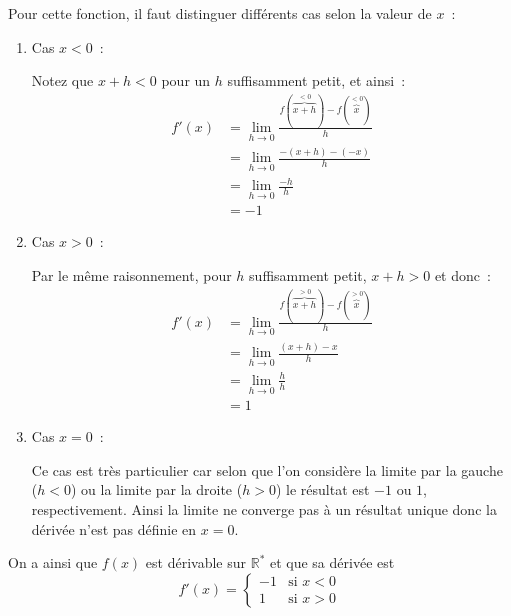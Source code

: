\begin{exercice}
\begin{enumerate}
    Pour cette fonction, il faut distinguer différents cas selon la valeur de $x$~:
    \begin{enumerate}
        \item Cas $x < 0$~:
        
        Notez que $x + h < 0$ pour un $h$ suffisamment petit, et ainsi~:
        \begin{align*}
            f'(x) &= \lim_{h \to 0} \frac{f(\overbrace{x + h}^{< 0}) - f(\overbrace{x}^{< 0})}{h} \\
            &= \lim_{h \to 0} \frac{-(x + h) - (-x)}{h} \\
            &= \lim_{h \to 0} \frac{-h}{h} \\
            &= -1
        \end{align*}
        
        \item Cas $x > 0$~:
        
        Par le même raisonnement, pour $h$ suffisamment petit, $x + h > 0$ et donc~:
        \begin{align*}
            f'(x) &= \lim_{h \to 0} \frac{f(\overbrace{x + h}^{> 0}) - f(\overbrace{x}^{> 0})}{h} \\
            &= \lim_{h \to 0} \frac{(x + h) - x}{h} \\
            &= \lim_{h \to 0} \frac{h}{h} \\
            &= 1
        \end{align*}
        
        \item Cas $x = 0$~:

        Ce cas est très particulier car selon que l'on considère la limite par la gauche ($h < 0$) ou la limite par la droite ($h > 0$) le résultat est $-1$ ou $1$, respectivement. Ainsi la limite ne converge pas à un résultat unique donc la dérivée n'est pas définie en $x = 0$.
    \end{enumerate}
    
    On a ainsi que $f(x)$ est dérivable sur $\mathbb{R}^*$ et que sa dérivée est
    \[
    f'(x) = \begin{cases} 
        -1 & \text{si } x < 0 \\
        1 & \text{si } x > 0
    \end{cases}
    \]
\end{enumerate}
\end{exercice}

